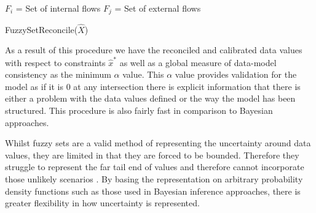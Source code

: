 \documentclass[ %
                    author={Tom Jager},
                supervisor={Dr. Daniel Schien},
                    degree={MEng},
                     title={A Bayesian Inference Engine for Calibrating Uncertainty over UMIS Structured MFA Systems},
                  subtitle={},
                      type={research},
                      year={2019} ]{dissertation}
\begin{document}
\begin{algorithm}[h!]
$F_i$ = Set of internal flows\; 
$F_j$ = Set of external flows \;
\caption{FuzzySetReconcile($\hat{X}$)}
    \label{alg:fuzzy_alg}
\end{algorithm}

As a result of this procedure we have the reconciled and calibrated data values with respect to constraints $\hat{x}^*$ as well as a global measure of data-model consistency as the minimum $\alpha$ value. This $\alpha$ value provides validation for the model as if it is 0 at any intersection there is explicit information that there is either a problem with the data values defined or the way the model has been structured. This procedure is also fairly fast in comparison to Bayesian approaches.


Whilst fuzzy sets are a valid method of representing the uncertainty around data values, they are limited in that they are forced to be bounded. Therefore they struggle to represent the far tail end of values and therefore cannot incorporate those unlikely scenarios \cite{laner2014systematic}. By basing the representation on arbitrary probability density functions such as those used in Bayesian inference approaches, there is greater flexibility in how uncertainty is represented.
\end{document}
